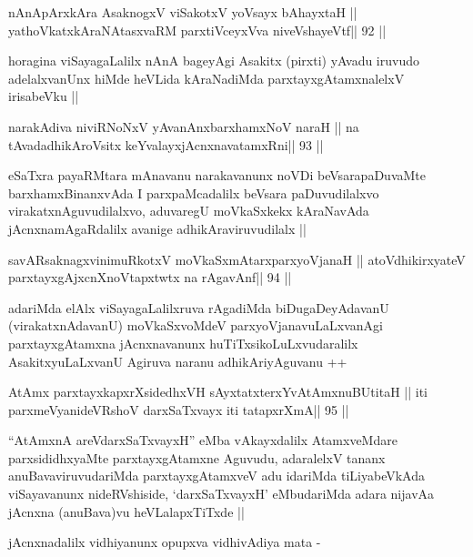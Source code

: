 \begin{shl}
nAnApArxkAra AsaknogxV viSakotxV yoV\s sayx bAhayxtaH ||
yathoVkatxkAraNAtasxvaRM parxtiVceyxVva niveVshayeVtf\hfill || 92 ||
\end{shl}

\begin{artha}
horagina viSayagaLalilx nAnA bageyAgi Asakitx (pirxti) yAvadu iruvudo
adelalxvanUnx hiMde heVLida kAraNadiMda parxtayxgAtamxnalelxV
irisabeVku ||
\end{artha}

\begin{shl}
narakAdiva niviRNoNxV yAvanAnx\s\s  barxhamxNoV naraH ||
na tAvadadhikAroV\s sitx keYvalayxjAcnxnavatamxRni\hfill || 93 ||
\end{shl}

\begin{artha}
eSaTxra payaRMtara mAnavanu narakavanunx noVDi beVsarapaDuvaMte
barxhamxBinanxvAda I parxpaMcadalilx beVsara paDuvudilalxvo
virakatxnAguvudilalxvo, aduvaregU moVkaSxkekx kAraNavAda
jAcnxnamAgaRdalilx avanige adhikAraviruvudilalx ||
\end{artha}

\begin{shl}
savARsaknagxvinimuRkotxV moVkaSxmAtarxparxyoVjanaH ||
atoV\s dhikirxyateV parxtayxgAjxcnXnoVtapxtwtx na rAgavAnf\hfill || 94 ||
\end{shl}

\begin{artha}
adariMda elAlx viSayagaLalilxruva rAgadiMda biDugaDeyAdavanU
(virakatxnAdavanU) moVkaSxvoMdeV parxyoVjanavuLaLxvanAgi
parxtayxgAtamxna jAcnxnavanunx huTiTxsikoLuLxvudaralilx
AsakitxyuLaLxvanU Agiruva naranu adhikAriyAguvanu ++
\end{artha}

\begin{shl}
AtAmx parxtayxkapxrXsidedhxVH sAyxtatxterxYvA\s\s tAmxnuBUtitaH ||
iti parxmeVyanideVRshoV darxSaTxvayx iti tatapxrXmA\hfill || 95 ||
\end{shl}

\begin{artha}
``AtAmxnA areVdarxSaTxvayxH'' eMba vAkayxdalilx AtamxveMdare
  parxsididhxyaMte parxtayxgAtamxne Aguvudu, adaralelxV tananx
  anuBavaviruvudariMda parxtayxgAtamxveV adu idariMda tiLiyabeVkAda
  viSayavanunx nideRVshiside, `darxSaTxvayxH' eMbudariMda adara
  nijavAa jAcnxna (anuBava)vu heVLalapxTiTxde ||
\end{artha}

\begin{artha}
jAcnxnadalilx vidhiyanunx opupxva vidhivAdiya mata -
\end{artha}

